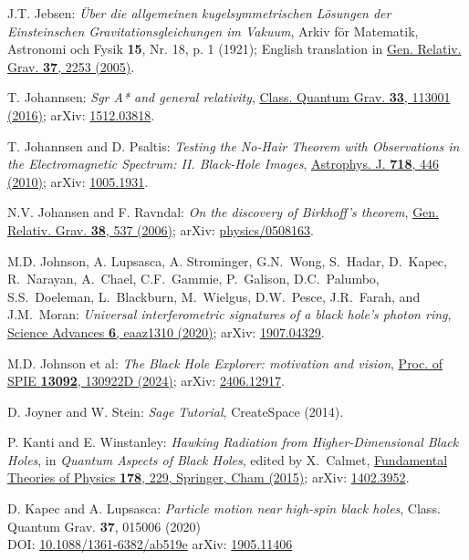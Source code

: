 \begin{thebibliography}{123}
J.T. Jebsen:
{\em Über die allgemeinen kugelsymmetrischen Lösungen der Einsteinschen
Gravitationsgleichungen im Vakuum},
Arkiv för Matematik, Astronomi och Fysik {\bf 15}, Nr. 18, p. 1 (1921);
English translation in
\href{https://doi.org/10.1007/s10714-005-0168-y}{Gen. Relativ. Grav. {\bf 37}, 2253 (2005)}.

T. Johannsen:
{\em Sgr A* and general relativity},
\href{https://doi.org/10.1088/0264-9381/33/11/113001}{Class. Quantum Grav.  {\bf 33}, 113001 (2016)};
arXiv: \href{https://arxiv.org/abs/1512.03818}{1512.03818}.

T. Johannsen and D. Psaltis:
{\em Testing the No-Hair Theorem with Observations in the Electromagnetic Spectrum: II. Black-Hole Images},
\href{https://doi.org/10.1088/0004-637X/718/1/446}{Astrophys. J. {\bf 718}, 446 (2010)};
arXiv: \href{https://arxiv.org/abs/1005.1931}{1005.1931}.

N.V. Johansen and F. Ravndal:
{\em On the discovery of Birkhoff's theorem},
\href{https://doi.org/10.1007/s10714-006-0242-0}{Gen. Relativ. Grav. {\bf 38}, 537 (2006)};
arXiv: \href{https://arxiv.org/abs/physics/0508163}{physics/0508163}.

M.D. Johnson, A. Lupsasca, A. Strominger, G.N.~Wong, S.~Hadar, D.~Kapec, R.~Narayan, A.~Chael,
C.F.~Gammie, P.~Galison, D.C.~Palumbo, S.S.~Doeleman, L.~Blackburn, M.~Wielgus, D.W.~Pesce,
J.R.~Farah, and J.M.~Moran:
{\em Universal interferometric signatures of a black hole's photon ring},
\href{https://doi.org/10.1126/sciadv.aaz1310}{Science Advances {\bf 6}, eaaz1310 (2020)};
arXiv: \href{https://arxiv.org/abs/1907.04329}{1907.04329}.

M.D. Johnson et al:
{\em The Black Hole Explorer: motivation and vision},
\href{https://doi.org/10.1117/12.3019835}{Proc. of SPIE {\bf 13092}, 130922D (2024)};
arXiv: \href{https://arxiv.org/abs/2406.12917}{2406.12917}.

D. Joyner and W. Stein: {\em Sage Tutorial}, CreateSpace (2014).

P. Kanti and E. Winstanley: {\em Hawking Radiation from Higher-Dimensional Black Holes},
in {\em Quantum Aspects of Black Holes}, edited by X.~Calmet,
\href{https://doi.org/10.1007/978-3-319-10852-0_8}{Fundamental Theories of Physics {\bf 178}, 229, Springer, Cham (2015)};
arXiv: \href{https://arxiv.org/abs/1402.3952}{1402.3952}.

D. Kapec and A. Lupsasca:
{\em Particle motion near high-spin black holes},
Class. Quantum Grav. {\bf 37}, 015006 (2020)\\
DOI: \href{https://doi.org/10.1088/1361-6382/ab519e}{10.1088/1361-6382/ab519e}\hfill
arXiv: \href{https://arxiv.org/abs/1905.11406}{1905.11406}


\end{thebibliography}

